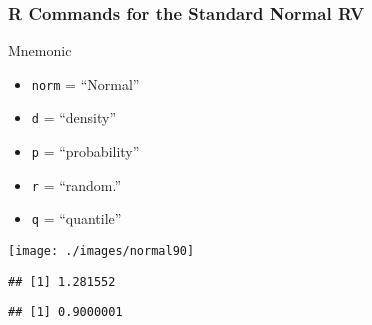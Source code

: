 \begin{frame}
  \frametitle{R Commands for the Standard Normal RV}

\begin{table}
\centering
{}
\end{table}

\begin{block}{Mnemonic}
  \begin{itemize}
    \item \texttt{norm} = ``Normal'' 
    \item \texttt{d} = ``density''
    \item \texttt{p} = ``probability'' 
    \item \texttt{r} = ``random.''
    \item \alert{\texttt{q} = ``quantile''}
  \end{itemize}
\end{block}

\end{frame}
\begin{frame}[fragile]
\vspace{-1em}
\begin{center}
\texttt{[image: ./images/normal90]}
\end{center}
\vspace{-2em}
\begin{knitrout}
\color{fgcolor}\begin{kframe}
\begin{alltt}
\hlstd{(}\hlstd{)}  
\end{alltt}
\begin{verbatim}
## [1] 1.281552
\end{verbatim}
\begin{alltt}
\hlstd{(}\hlstd{)}  
\end{alltt}
\begin{verbatim}
## [1] 0.9000001
\end{verbatim}
\end{kframe}
\end{knitrout}

\end{frame}
